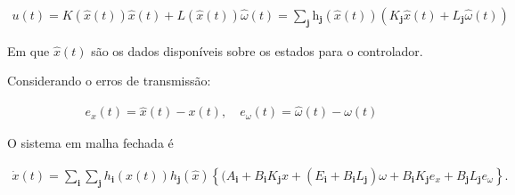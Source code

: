 \begin{gather}
    u(t)=K(\hat{x}(t)) \hat{x}(t) + L(\hat{x}(t)) \hat{\omega}(t)=\sum_{\mathbf{j} 
    } \mathrm{h}_{\mathbf{j}}(\hat{x}(t)) \left( K_{\mathbf{j}} \hat{x}(t)  + L_{\mathbf{j}} \hat{\omega}(t) \right)
\end{gather}

Em que $\hat{x}(t)$ são os dados disponíveis sobre os estados para o controlador.

\vspace{0.5cm}
Considerando o erros de transmissão:

\begin{gather}
    e_x(t)=\hat{x}(t)-x(t), \quad e_\omega(t)=\hat{\omega}(t)-\omega(t)
\end{gather}

O sistema em malha fechada é

\begin{gather}
    \dot{x}(t) = \sum_{\mathbf{i}} \sum_{\mathbf{j}} h_\mathbf{i}(x(t)) h_\mathbf{j}(\hat{x}) \left\{ (A_{\mathbf{i}} + B_{\mathbf{i}}K_{\mathbf{j}}x + (E_{\mathbf{i}} + B_{\mathbf{i}}L_{\mathbf{j}})\omega + B_{\mathbf{i}}K_{\mathbf{j}}e_x + B_{\mathbf{j}}L_{\mathbf{j}}e_\omega \right\}.
\end{gather}
